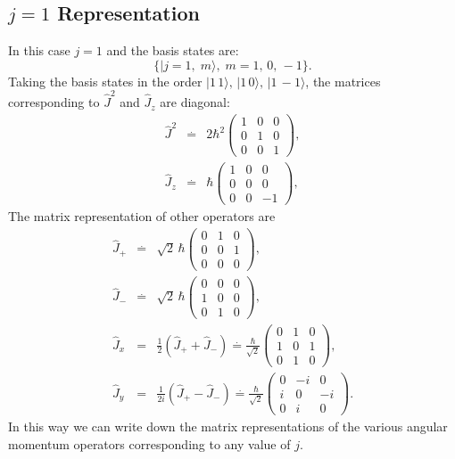 \subsection{\texorpdfstring{$j=1$}{PDFstring} Representation}

In this case $j=1$ and the basis states are:
\[ \{|j=1,\; m\rangle, \; m=1,\, 0,\, -1 \}. \]
Taking the basis states in the order $|1\, 1\rangle,\, |1\, 0\rangle, \, |1\, -1\rangle$, the matrices corresponding to 
$\hat{J}^2$ and $\hat{J}_z$ are diagonal:
\begin{eqnarray}
\hat{J}^2 & \stackrel{.}{=} & 2\hbar^2 \begin{pmatrix}1 & 0 & 0 \\ 0 & 1 & 0 \\ 0 & 0 & 1\end{pmatrix}, \\
\hat{J}_z & \stackrel{.}{=} & \hbar \begin{pmatrix}1 & 0 & 0 \\ 0 & 0 & 0 \\ 0 & 0 & -1\end{pmatrix}, 
\end{eqnarray}
The matrix representation of other operators are
\begin{eqnarray}
\hat{J}_+ & \stackrel{.}{=} & \sqrt{2}\, \hbar \begin{pmatrix}0 & 1 & 0 \\ 0 & 0 & 1 \\ 0 & 0 & 0\end{pmatrix}, \\
\hat{J}_- & \stackrel{.}{=} & \sqrt{2}\, \hbar \begin{pmatrix}0 & 0 & 0 \\ 1 & 0 & 0 \\ 0 & 1 & 0\end{pmatrix}, \\
\hat{J}_x & = & \frac{1}{2}(\hat{J}_+ + \hat{J}_-) \stackrel{.}{=}
\frac{\hbar}{\sqrt{2}} \begin{pmatrix}0 & 1 & 0 \\ 1 & 0 & 1 \\ 0 & 1 & 0\end{pmatrix}, \\
\hat{J}_y & = & \frac{1}{2i}(\hat{J}_+ - \hat{J}_-) \stackrel{.}{=}
\frac{\hbar}{\sqrt{2}} \begin{pmatrix}0 & -i & 0 \\ i & 0 & -i \\ 0 & i & 0\end{pmatrix}. 
\end{eqnarray}
In this way we can write down the matrix representations of the various angular momentum operators corresponding to any value 
of $j$.

